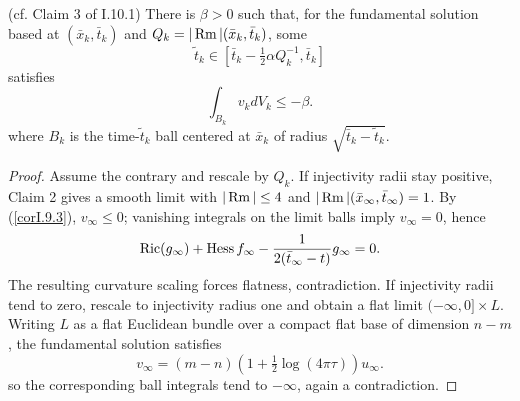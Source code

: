 \begin{lemma}
  \label{lem:kl-upper-bound-integral-integral-bound-pseudolocality-2}
  (cf. Claim 3 of I.10.1) \label{Claim 3}
There is $\beta>0$ such that, for the fundamental solution based at
$(\bar x_k,\bar t_k)$ and $Q_k=|\operatorname{Rm}|(\bar x_k,\bar t_k)$, some
\begin{equation}
\tilde t_k\in[\bar t_k-\tfrac12\alpha Q_k^{-1},\bar t_k]
\end{equation}
satisfies
\begin{equation}\int_{B_k}v_kdV_k\le-\beta.\end{equation}
where $B_k$ is the time-$\tilde t_k$ ball centered at $\bar x_k$ of radius
$\sqrt{\bar t_k-\tilde t_k}$.
\end{lemma}
\begin{proof}
\sketch
Assume the contrary and rescale by $Q_k$. If injectivity radii stay positive,
Claim 2 gives a smooth limit with $|\operatorname{Rm}|\le4$ and $|\operatorname{Rm}|(\bar x_\infty,\bar t_\infty)=1$.
By (\ref{corI.9.3}), $v_\infty\le0$; vanishing integrals on the limit balls imply
$v_\infty=0$, hence
\begin{equation}\operatorname{Ric}(g_\infty)+\operatorname{Hess} f_\infty-{1\over2(\bar t_\infty-t)}g_\infty=0.
\end{equation}
The resulting curvature scaling forces flatness, contradiction. If injectivity
radii tend to zero, rescale to injectivity radius one and obtain a flat limit
$(-\infty,0]\times L$. Writing $L$ as a flat Euclidean bundle over a compact flat
base of dimension $n-m$, the fundamental solution satisfies
\begin{equation}v_\infty=(m-n)\left(1+\tfrac12\log(4\pi\tau)\right)u_\infty.\end{equation}
so the corresponding ball integrals tend to $-\infty$, again a contradiction.
\end{proof}

